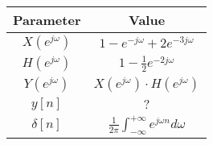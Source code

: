 
    \begin{tabular}{|c|c|}
       \hline
        \textbf{Parameter} & \textbf{Value}\\
        \hline
        $X(e^{j\omega})$ & $1 - e^{-j\omega} + 2e^{-3j\omega}$ \\
        \hline
        $H(e^{j\omega})$ & $1 - \frac{1}{2} e^{-2j\omega}$ \\
        \hline
        $Y(e^{j\omega})$ & $X(e^{j\omega}) \cdot H(e^{j\omega})$\\
        \hline
        $y[n]$           & $?$\\
        \hline
        $\delta[n]$  & $\frac{1}{2\pi}\int_{-\infty}^{+\infty} e^{j\omega n} d\omega$\\
        \hline
    \end{tabular}
    
